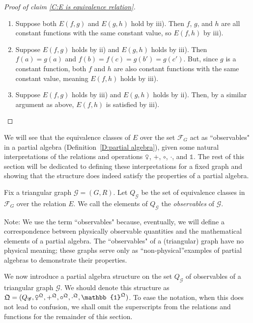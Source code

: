 \documentclass{scrartcl}
\newcommand{\SF}{\mathscr{F}}
\newcommand{\SG}{\mathscr{G}}
\newcommand{\com}{\mathrel{\venus}}
\begin{document}
\begin{proof}[Proof of claim \ref{C:E is equivalence relation}]
\begin{enumerate}
\begin{enumerate}[(1)]
If $c'$ is the common element, then, by a similar argument, $E(f,h)$ is satisfied by iii).

\item Suppose both $E(f,g)$ and $E(g,h)$ hold by iii). Then $f$, $g$, and $h$ are all constant functions with the same constant value, so $E(f,h)$ by iii).

\item Suppose $E(f,g)$ holds by ii) and $E(g,h)$ holds by iii). Then $f(a)=g(a)$ and $f(b)=f(c)=g(b')=g(c')$. But, since $g$ is a constant function, both $f$ and $h$ are also constant functions with the same constant value, meaning $E(f,h)$ holds by iii).

\item Suppose $E(f,g)$ holds by iii) and $E(g,h)$ holds by ii). Then, by a similar argument as above, $E(f,h)$ is satisfied by iii).
\end{enumerate}
\end{enumerate}
\end{proof}


We will see that the equivalence classes of $E$ over the set $\SF_G$ act as ``observables" in a partial algebra (Definition~\ref{D:partial algebra}), given some natural interpretations of the relations and operations $\com$, $+$, $\circ$, $\cdot$, and $\mathbb{1}$. The rest of this section will be dedicated to defining these interpretations for a fixed graph and showing that the structure does indeed satisfy the properties of a partial algebra.

\begin{definition}\label{D:graph observables}
Fix a triangular graph $\SG=(G,R)$. Let $Q_{\SG}$ be the set of equivalence classes in $\SF_G$ over the relation $E$. We call the elements of $Q_{\SG}$ the \emph{observables} of $\SG$.
\end{definition}

Note: We use the term ``observables" because, eventually, we will define a correspondence between physically observable quantities and the mathematical elements of a partial algebra. The ``observables" of a (triangular) graph have no physical meaning; these graphs serve only as ``non-physical''examples of partial algebras to demonstrate their properties.

We now introduce a partial algebra structure on the set $Q_{\SG}$ of observables of a triangular graph $\SG$. We should denote this structure as $\mathfrak{Q}=(Q_{\SG},\com^{\mathfrak{Q}},+^{\mathfrak{Q}},\circ^{\mathfrak{Q}},\cdot^{\mathfrak{Q}},\mathbb{1}^{\mathfrak{Q}})$. To ease the notation, when this does not lead to confusion, we shall omit the superscripts from the relations and functions for the remainder of this section.
\end{document}
